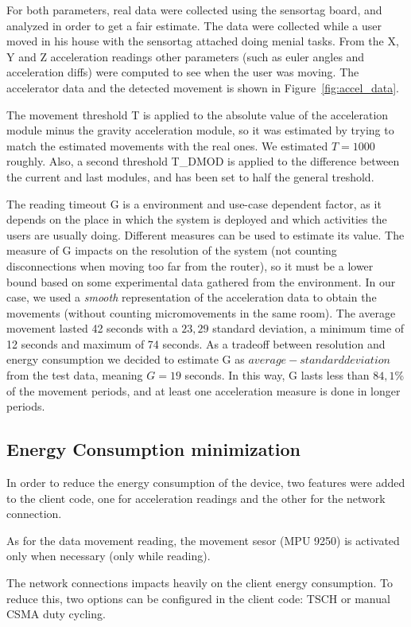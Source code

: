 \documentclass[a4paper, 11pt]{article}
\begin{document}
For both parameters, real data were collected using the sensortag board, and analyzed in order to get a fair estimate.
The data were collected while a user moved in his house with the sensortag attached doing menial tasks.
From the X, Y and Z acceleration readings other parameters (such as euler angles and acceleration diffs) were computed to see when the user was moving.
The accelerator data and the detected movement is shown in Figure~\ref{fig:accel_data}.

The movement threshold T is applied to the absolute value of the acceleration module minus the gravity acceleration module, so it was estimated by trying to match the estimated movements with the real ones. We estimated $T = 1000$ roughly. Also, a second threshold T\_DMOD is applied to the difference between the current and last modules, and has been set to half the general treshold. 

The reading timeout G is a environment and use-case dependent factor, as it depends on the place in which the system is deployed and which activities the users are usually doing.
Different measures can be used to estimate its value.
The measure of G impacts on the resolution of the system (not counting disconnections when moving too far from the router), so it must be a lower bound based on some experimental data gathered from the environment.
In our case, we used a \emph{smooth} representation of the acceleration data to obtain the movements (without counting micromovements in the same room).
The average movement lasted 42 seconds with a $23,29$ standard deviation, a minimum time of 12 seconds and maximum of 74 seconds.
As a tradeoff between resolution and energy consumption we decided to estimate G as $average - standard deviation$ from the test data, meaning $G = 19$ seconds.
In this way, G lasts less than $84,1$\% of the movement periods, and at least one acceleration measure is done in longer periods.

\subsection*{Energy Consumption minimization}
In order to reduce the energy consumption of the device, two features were added to the client code, one for acceleration readings and the other for the network connection.

As for the data movement reading, the movement sesor (MPU 9250) is activated only when necessary (only while reading). 

The network connections impacts heavily on the client energy consumption. To reduce this, two options can be configured in the client code: TSCH or manual CSMA duty cycling.
\end{document}
